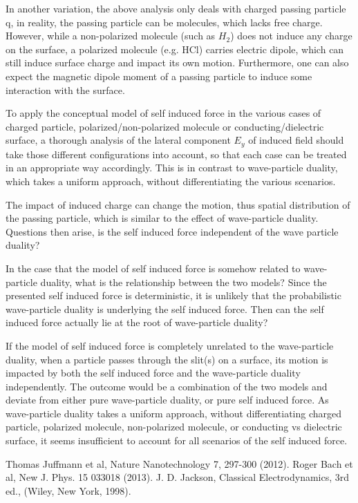 \documentclass[prd,showpacs,twocolumn]{revtex4-1}
\begin{document}
In another variation, the above analysis only deals with charged passing particle q, in reality, the passing particle can be molecules, which lacks free charge. However, while a non-polarized molecule (such as $H_2$) does not induce any charge on the surface, a polarized molecule (e.g. HCl) carries electric dipole, which can still induce surface charge and impact its own motion. Furthermore, one can also expect the magnetic dipole moment of a passing particle to induce some interaction with the surface.

To apply the conceptual model of self induced force in the various cases of charged particle, polarized/non-polarized molecule or conducting/dielectric surface, a thorough analysis of the lateral component $E_y$ of induced field should take those different configurations into account, so that each case can be treated in an appropriate way accordingly. This is in contrast to wave-particle duality, which takes a uniform approach, without differentiating the various scenarios.

The impact of induced charge can change the motion, thus spatial distribution of the passing particle, which is similar to the effect of wave-particle duality. Questions then arise, is the self induced force independent of the wave particle duality? 

In the case that the model of self induced force is somehow related to wave-particle duality, what is the relationship between the two models? Since the presented self induced force is deterministic, it is unlikely that the probabilistic wave-particle duality is underlying the self induced force. Then can the self induced force actually lie at the root of wave-particle duality?

If the model of self induced force is completely unrelated to the wave-particle duality, when a particle passes through the slit(s) on a surface, its motion is impacted by both the self induced force and the wave-particle duality independently. The outcome would be a combination of the two models and deviate from either pure wave-particle duality, or pure self induced force. As wave-particle duality takes a uniform approach, without differentiating charged particle, polarized molecule, non-polarized molecule, or conducting vs dielectric surface, it seems insufficient to account for all scenarios of the self induced force.


\begin{thebibliography}{0}
\label{sec:TeXbooks}
 Thomas Juffmann et al, Nature Nanotechnology 7, 297-300 (2012).
 Roger Bach et al, New J. Phys. 15 033018 (2013).
 J. D. Jackson, Classical Electrodynamics, 3rd ed., (Wiley, New York, 1998).
\end{thebibliography}
\end{document}
